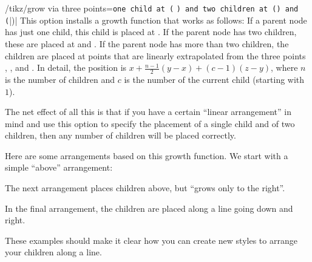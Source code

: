 \begin{key}{/tikz/grow via three points=\texttt{one child at (}
        \texttt{) and two children at (}\texttt{) and (}|)|%
}
    This option installs a growth function that works as follows: If a parent
    node has just one child, this child is placed at . If the parent
    node has two children, these are placed at  and . If the
    parent node has more than two children, the children are placed at points
    that are linearly extrapolated from the three points , ,
    and . In detail, the position is $x + \frac{n-1}{2}(y-x) +
    (c-1)(z-y)$, where $n$ is the number of children and $c$ is the number of
    the current child (starting with~$1$).

    The net effect of all this is that if you have a certain ``linear
    arrangement'' in mind and use this option to specify the placement of a
    single child and of two children, then any number of children will be
    placed correctly.

    Here are some arrangements based on this growth function. We start with a
    simple ``above'' arrangement:
\begin{codeexample}[]
\end{codeexample}

    The next arrangement places children above, but ``grows only to the
    right''.
\begin{codeexample}[]
\end{codeexample}

    In the final arrangement, the children are placed along a line going down
    and right.
\begin{codeexample}[]
\end{codeexample}

    These examples should make it clear how you can create new styles to
    arrange your children along a line.
\end{key}

